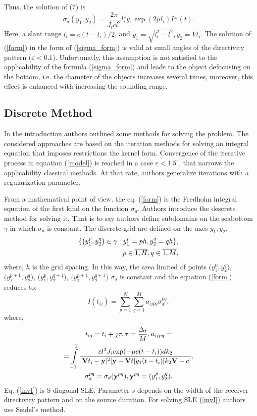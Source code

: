 \documentclass{procDDs}
\begin{document}
Thus, the solution of (7) is
\begin{equation}
\label{sigma_form}
\sigma_d \left( y_1, y_2 \right) = \frac{2\pi}{J_icl^2} l_i^4 y_1 \exp(2\mu l_i)I^\pm(t).
\end{equation}
Here, a slant range $l_i=c(t-t_i)/2$, and $y_1=\sqrt{l_i^2-l^2}, y_2=Vt_i$.
The solution of (\ref{form}) in the form of (\ref{sigma_form}) is valid at small angles of the directivity pattern ($\varepsilon<0.1$). Unfortunatly, this assumption is not satisfied to the applicability of the formula (\ref{sigma_form}) and leads to the object defocusing on the bottom, i.e. the diameter of the objects increases several times, moreover, this effect is enhanced with increasing the sounding range.

\subsection{Discrete Method}
In the introduction authors outlined some methods for solving the problem.  The considered approaches are based on the iteration methods for solving an integral equation that imposes restrictions the kernel form. Convergence of the iterative process in equation (\ref{model}) is reached in a case $\varepsilon < 1.5^\circ$, that narrows the applicability classical methods. At that rate, authors generalize iterations with a regularization parameter.

From a mathematical point of view, the eq. (\ref{form}) is the Fredholm integral equation of the first kind on the function $\sigma_d$. Authors introduce the descrete method for solving it. That is to say authors define subdomains on the seabottom $\gamma$ in which $\sigma_d$ is constant. The discrete grid are defined  on the axes $y_1, y_2$.
\begin{align}
	\{ \big( y_1^p, y_2^q \big) \in\gamma: y_1^p = ph, y_2^q = qh \}, \notag \\ 
	p \in \overline{1, H}, q \in \overline{1, M}, 
\end{align}
where, $h$ is the grid spacing. In this way, the area limited of points $\big(y_1^p, y_2^q\big)$, $\big(y_1^{p+1}, y_2^q\big)$, $\big(y_1^p, y_2^{q+1}\big)$, $\big(y_1^{p+1}, y_2^{q+1}\big)$ $\sigma_d$  is constant and the equation (\ref{form}) reduces to:
\begin{equation}
\label{invI}
I(t_{ij}) = \sum \limits_{p=1}^{N} \sum \limits_{q=1}^{M} a_{ijpq}\sigma_d^{pq},
\end{equation}
where,
\begin{multline*}
	t_{ij} = t_i+j\tau, \tau = \frac{\Delta_t}{M}, a_{ijpq} = \\ 
	=  \int\limits_{-1}^{1}
	\frac{cl^2J_i \text{exp}(-\mu c(t-t_i))dk_2}{|\mathbf{V}t_i-\mathbf{y}|^2|\mathbf{y}-\mathbf{V}t|y_1(t-t_i)|k_2 \mathbf{V}-c|}, \\
	\sigma_d^{pq} = \sigma_d(\textbf{y}^{pq}), \textbf{y}^{pq} = (y_1^p, y_2^q).
\end{multline*}
Eq. (\ref{invI}) is S-diagonal SLE. Parameter $s$ depends on the width of the receiver directivity pattern and on the source duration. For solving SLE (\ref{invI}) authors use  Seidel's method.
\end{document}

